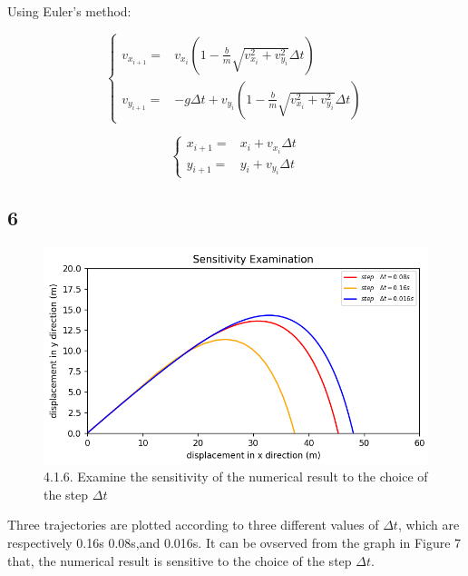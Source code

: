 \documentclass{article}
\begin{document}
\vspace{0.01\textheight}
Using Euler's method:
\vspace{0.01\textheight}

$$
\begin{cases}
    v_{x_{i+1}}= & v_{x_{i}}(1-\frac{b}{m}\sqrt{v_{x_{i}}^{2}+v_{y_{i}}^{2}}\Delta t)            \\

    v_{y_{i+1}}= & -g\Delta t+v_{y_{i}}(1-\frac{b}{m}\sqrt{v_{x_{i}}^{2}+v_{y_{i}}^{2}}\Delta t)
\end{cases}
$$

\vspace{0.006\textheight}
$$
  \begin{cases}
    x_{i+1}= & x_{i}+v_{x_{i}}\Delta t \\

    y_{i+1}= & y_{i}+v_{y_{i}}\Delta t
  \end{cases}
$$

\newpage
\subsection*{6}
\begin{figure}[H]
  \centering
  \includegraphics[scale=0.6]{./graphs/project4.1.6.png}
  \caption{4.1.6. Examine the sensitivity of the numerical result to the choice of the step $\Delta t$}
\end{figure}
Three trajectories are plotted according to three different values of {$\Delta t$}, which are respectively 0.16s 0.08s,and 0.016s.
It can be ovserved from the graph in Figure 7 that, the numerical result is sensitive to the choice of the step {$\Delta t$}.

\vspace{0.01\textheight}
\end{document}
